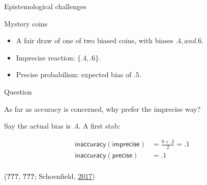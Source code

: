 \documentclass[10pt,ignorenonframetext,x11names, dvipsnames, bibspacing,natbib]{beamer}
\providecommand{\tightlist}{%
  \setlength{\itemsep}{0pt}\setlength{\parskip}{0pt}}
\begin{document}
\begin{frame}{Epistemological challenges}

\begin{block}{Mystery coins}

\begin{itemize}
\tightlist
\item
  A fair draw of one of two biased coins, with biases \(.4, and .6\).
\end{itemize}

\pause

\vspace{-2mm}

\begin{itemize}
\tightlist
\item
  Imprecise reaction: \(\{.4, .6\}\).
\end{itemize}

\pause

\vspace{-2mm}

\begin{itemize}
\tightlist
\item
  Precise probabilism: expected bias of \(.5\).
\end{itemize}

\pause

\end{block}

\begin{block}{Question}

As far as accuracy is concerned, why prefer the imprecise way?

Say the actual bias is .4. A first stab:

\vspace{-3mm}

\begin{align*}
\mathsf{inaccuracy(imprecise)} & = \frac{0 + .2}{2} = .1\\
\mathsf{inaccuracy(precise)} & =  .1\\
\end{align*}

\vspace{-5mm} \scriptsize

({\textbf{???}}, {\textbf{???}}; Schoenfield,
\protect\hyperlink{ref-schoenfield2017AccuracyRationalityImprecise}{2017})

\end{block}

\end{frame}
\end{document}
